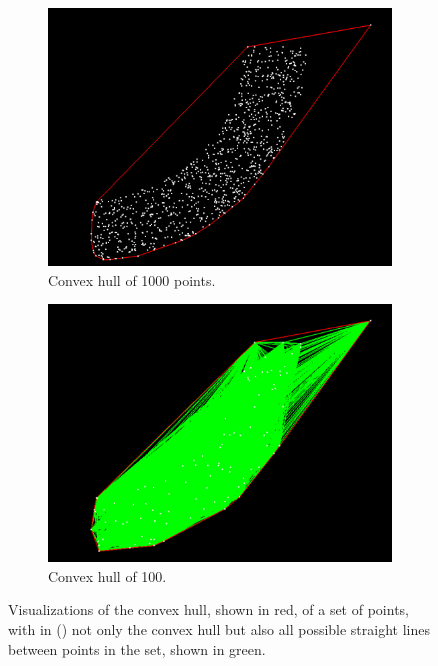 	\begin{figure}
		\centering
		\begin{subfigure}[t]{0.45\textwidth}
			\centering
			\includegraphics[width=\textwidth]{./img/c_convexHull}
			\caption{Convex hull of 1000 points.}
			\label{subfig:c:convexHull}
		\end{subfigure}
		\begin{subfigure}[t]{0.45\textwidth}
			\centering
			\includegraphics[width=\textwidth]{./img/c_convexHullTest}
			\caption{Convex hull of 100.}
			\label{subfig:c:convexHullTest}
		\end{subfigure}	
		\caption{Visualizations of the convex hull, shown in red, of a set of points, with in () not only the convex hull but also all possible straight lines between points in the set, shown in green.}
		\label{fig:c:convexHulls}
	\end{figure}


